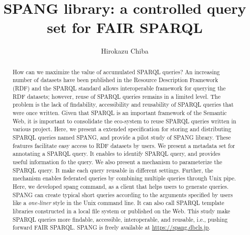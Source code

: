 \documentclass[runningheads]{llncs}
\begin{document}
%
\title{SPANG library: a controlled query set for FAIR SPARQL}
%
%
\author{Hirokazu Chiba}
%
%
%
\maketitle              %
%
\begin{abstract}
How can we maximize the value of accumulated SPARQL queries? An increasing number of datasets have been published in the Resource Description Framework (RDF) and the SPARQL standard allows interoperable framework for querying the RDF datasets; however, reuse of SPARQL queries remains in a limited level. The problem is the lack of findability, accessibility and reusability of SPARQL queries that were once written. Given that SPARQL is an important framework of the Semantic Web, it is important to consolidate the eco-system to reuse SPARQL queries written in various project.
Here, we present a extended specification for storing and distributing SPARQL queries named SPANG, and provide a pilot study of SPANG library.
These features facilitate easy access to RDF datasets by users. 
We present a metadata set for annotating a SPARQL query.
It enables to identify SPARQL query, and provides useful information fo the query.
We also present a mechanism to parameterize the SPARQL query.
It make each query reusable in different settings.
Further, the mechanism enables federated queries by combining multiple queries through Unix pipe. 
Here, we developed spang command, as a client that helps users to generate queries. SPANG can create typical short queries according to the arguments specified by users like a \textit{one-liner} style in the Unix command line. It can also call SPARQL template libraries constructed in a local file system or published on the Web. 
This study make SPARQL queries more findable, accessible, interoperable, and reusable, i.e., pushing forward FAIR SPARQL.
SPANG is freely available at \url{https://spang.dbcls.jp}.
\end{abstract}
%
%
%
\end{document}
